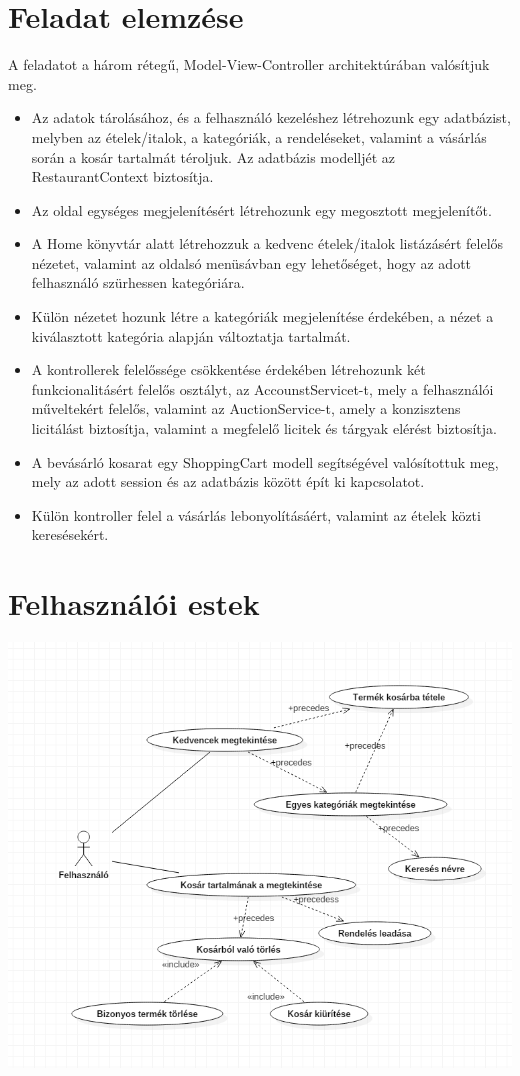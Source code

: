 \documentclass[12pt,a4paper]{article}
\begin{document}
\section{Feladat elemzése}
A feladatot a három rétegű, Model-View-Controller architektúrában valósítjuk meg.
\begin{itemize}
\item Az adatok tárolásához, és a felhasználó kezeléshez létrehozunk egy adatbázist, melyben az ételek/italok, a kategóriák,  a rendeléseket, valamint a vásárlás során a kosár tartalmát téroljuk. Az adatbázis modelljét az RestaurantContext biztosítja.
\item Az oldal egységes megjelenítésért létrehozunk egy megosztott megjelenítőt.
\item A Home könyvtár alatt létrehozzuk a kedvenc ételek/italok listázásért felelős nézetet, valamint az oldalsó menüsávban egy lehetőséget, hogy az adott felhasználó szürhessen kategóriára.
\item Külön nézetet hozunk létre a kategóriák megjelenítése érdekében, a nézet a kiválasztott kategória alapján változtatja tartalmát.
\item A kontrollerek felelőssége csökkentése érdekében létrehozunk két funkcionalitásért felelős osztályt, az AccounstServicet-t, mely a felhasználói műveltekért felelős, valamint az AuctionService-t, amely a konzisztens licitálást biztosítja, valamint a megfelelő licitek és tárgyak elérést biztosítja.
\item A bevásárló kosarat egy ShoppingCart modell segítségével valósítottuk meg, mely az adott session és az adatbázis között épít ki kapcsolatot.
\item Külön kontroller felel a vásárlás lebonyolításáért, valamint az ételek közti keresésekért.
\end{itemize}

\section{Felhasználói estek}
\includegraphics[scale=0.7]{usecase}
\end{document}
